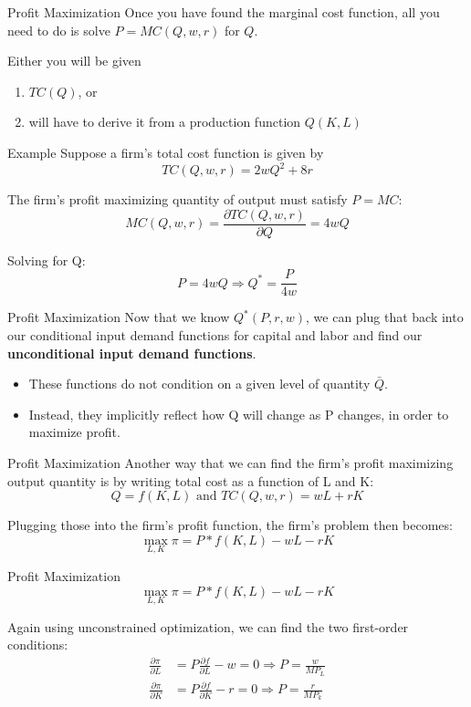 \documentclass[11pt,t]{beamer}
\begin{document}
\begin{frame}{Profit Maximization}
  Once you have found the marginal cost function, all you need to do is solve $P = MC(Q,w,r)$ for $Q$.
  
  Either you will be given
  \begin{enumerate}
    \item $TC(Q)$, or
    
    \item will have to derive it from a production function $Q(K, L)$
  \end{enumerate}
\end{frame}

\begin{frame}{Example}
  Suppose a firm's total cost function is given by
  $$
    TC(Q,w,r) = 2wQ^2+8r
  $$

  \bigskip
  The firm's profit maximizing quantity of output must satisfy $P = MC$:
  \pause
  $$
    MC(Q,w,r) = \frac{\partial TC(Q,w,r)}{\partial Q} = 4wQ
  $$

  \bigskip
  Solving for Q:
  \pause
  $$
    P=4wQ  \Rightarrow Q^* = \frac{P}{4w}
  $$
\end{frame}

\begin{frame}{Profit Maximization}
  Now that we know $Q^*(P,r,w)$, we can plug that back into our conditional input demand functions for capital and labor and find our \textbf{unconditional input demand functions}.

  \begin{itemize}
    \item These functions do not condition on a given level of quantity $\bar{Q}$.
    
    \item Instead, they implicitly reflect how Q will change as P changes, in order to maximize profit.
  \end{itemize}
\end{frame}

\begin{frame}{Profit Maximization}
  Another way that we can find the firm's profit maximizing output quantity is by writing total cost as a function of L and K:
  $$
    Q = f(K,L) \text{ and } TC(Q,w,r) = wL + rK
  $$ 
  
  Plugging those into the firm's profit function, the firm's problem then becomes:
  $$
    \max_{L,K} \pi = P*f(K,L) - wL - rK
  $$
\end{frame}

\begin{frame}{Profit Maximization}
  $$
    \max_{L,K} \pi = P*f(K,L) - wL - rK
  $$
  
  Again using unconstrained optimization, we can find the two first-order conditions:
  \begin{align*}
    \frac{\partial \pi}{\partial L} & =P \frac{\partial f}{\partial L} - w = 0 \Rightarrow P = \frac{w}{MP_L} \\
    \frac{\partial \pi}{\partial K} & =P \frac{\partial f}{\partial K} - r = 0 \Rightarrow P = \frac{r}{MP_k}
  \end{align*}
\end{frame}
\end{document}
